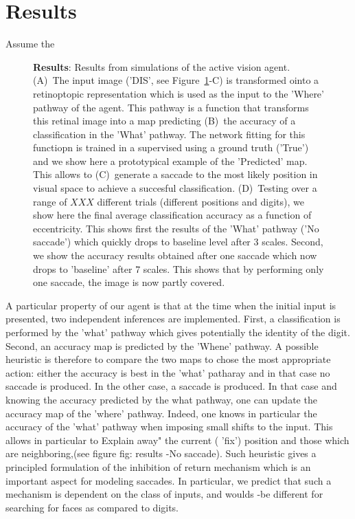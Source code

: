 \section{Results}
\label{sec:results}

Assume the 

\begin{figure}%
\caption{
{\bf Results}: Results from simulations of the active vision agent.
(A)~The input image ('DIS', see  Figure~\ref{fig:results}-C)  is transformed ointo a retinoptopic representation which is used as the input to the 'Where' pathway of the agent. This pathway is a function that transforms this retinal image into a map predicting (B)~the accuracy of a classification in the 'What' pathway. The network fitting for this functiopn is trained in a supervised using a ground truth ('True') and we show here a prototypical example of the 'Predicted' map. This allows to (C)~generate a saccade to the most likely position in visual space to achieve a succesful classification. (D)~Testing over a range of $XXX$ different trials (different positions and digits), we show here the final average classification accuracy as a function of eccentricity. This shows first the results of the 'What' pathway ('No saccade') which quickly drops to baseline level after 3 scales. Second, we show the accuracy results obtained after one saccade which now drops to 'baseline' after 7 scales. This shows that by performing only one saccade, the image is now partly covered.
\label{fig:results}}%
\end{figure}%




A particular property of our agent
is that at the time when the initial
input is presented, two independent inferences
are implemented. First, a classification
is performed by the 'what' pathway which
gives potentially the identity of the digit.
Second, an accuracy map is predicted
by the 'Whene' pathway. A possible heuristic
is therefore to compare the two maps to
chose the most appropriate action: either
the accuracy is best in the 'what'
patharay and in that case no saccade
is produced. In the other case, a
saccade is produced. In that case and
knowing the accuracy predicted by the
what pathway, one can update the
accuracy map of the 'where' pathway.
Indeed, one knows in particular the
accuracy of the 'what' pathway when
imposing small shifts to the input.
This allows in particular to Explain
away" the current ( 'fix') position and
those which are neighboring,(see figure
{fig: results} -No saccade). Such heuristic
gives a principled formulation of the
inhibition of return mechanism which
is an important aspect for modeling saccades.
In particular, we predict that such a
mechanism is dependent on the class
of inputs, and woulds -be different for
searching for faces as compared to digits.
